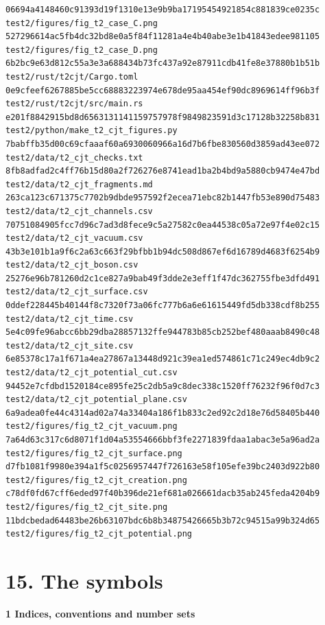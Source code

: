 \documentclass[
  10pt,
]{article}
\begin{document}
\begin{verbatim}
06694a4148460c91393d19f1310e13e9b9ba17195454921854c881839ce0235c  test2/figures/fig_t2_case_C.png
527296614ac5fb4dc32bd8e0a5f84f11281a4e4b40abe3e1b41843edee981105  test2/figures/fig_t2_case_D.png
6b2bc9e63d812c55a3e3a688434b73fc437a92e87911cdb41fe8e37880b1b51b  test2/rust/t2cjt/Cargo.toml
0e9cfeef6267885be5cc68883223974e678de95aa454ef90dc8969614ff96b3f  test2/rust/t2cjt/src/main.rs
e201f8842915bd8d6563131141159757978f9849823591d3c17128b32258b831  test2/python/make_t2_cjt_figures.py
7babffb35d00c69cfaaaf60a6930060966a16d7b6fbe830560d3859ad43ee072  test2/data/t2_cjt_checks.txt
8fb8adfad2c4ff76b15d80a2f726276e8741ead1ba2b4bd9a5880cb9474e47bd  test2/data/t2_cjt_fragments.md
263ca123c671375c7702b9dbde957592f2ecea71ebc82b1447fb53e890d75483  test2/data/t2_cjt_channels.csv
70751084905fcc7d96c7ad3d8fece9c5a27582c0ea44538c05a72e97f4e02c15  test2/data/t2_cjt_vacuum.csv
43b3e101b1a9f6c2a63c663f29bfbb1b94dc508d867ef6d16789d4683f6254b9  test2/data/t2_cjt_boson.csv
25276e96b781260d2c1ce827a9bab49f3dde2e3eff1f47dc362755fbe3dfd491  test2/data/t2_cjt_surface.csv
0ddef228445b40144f8c7320f73a06fc777b6a6e61615449fd5db338cdf8b255  test2/data/t2_cjt_time.csv
5e4c09fe96abcc6bb29dba28857132ffe944783b85cb252bef480aaab8490c48  test2/data/t2_cjt_site.csv
6e85378c17a1f671a4ea27867a13448d921c39ea1ed574861c71c249ec4db9c2  test2/data/t2_cjt_potential_cut.csv
94452e7cfdbd1520184ce895fe25c2db5a9c8dec338c1520ff76232f96f0d7c3  test2/data/t2_cjt_potential_plane.csv
6a9adea0fe44c4314ad02a74a33404a186f1b833c2ed92c2d18e76d58405b440  test2/figures/fig_t2_cjt_vacuum.png
7a64d63c317c6d8071f1d04a53554666bbf3fe2271839fdaa1abac3e5a96ad2a  test2/figures/fig_t2_cjt_surface.png
d7fb1081f9980e394a1f5c0256957447f726163e58f105efe39bc2403d922b80  test2/figures/fig_t2_cjt_creation.png
c78df0fd67cff6eded97f40b396de21ef681a026661dacb35ab245feda4204b9  test2/figures/fig_t2_cjt_site.png
11bdcbedad64483be26b63107bdc6b8b34875426665b3b72c94515a99b324d65  test2/figures/fig_t2_cjt_potential.png
\end{verbatim}

\hypertarget{the-symbols}{%
\section{15. The symbols}\label{the-symbols}}

\textbf{1 Indices, conventions and number sets}
\end{document}
